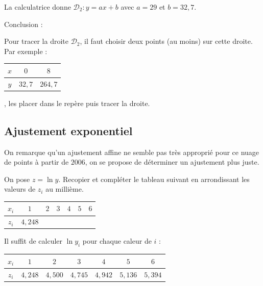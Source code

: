\documentclass[french]{book}
\begin{document}
La calculatrice donne $\mathcal{D}_2:y=ax+b$ avec $a=29$ et $b=32,7$.

Conclusion : 

Pour tracer la droite $\mathcal{D}_2$, il faut choisir deux points (au moins) sur cette droite.\\
Par exemple : \quad 
\begin{tabular}{C{1}|C{1}|C{1}}
   $x$ & $0$ & $8$ \\
   \hline
   $y$ & $32,7$ & $264,7$ \\
\end{tabular}
\quad , les placer dans le repère puis tracer la droite.

\subsection{Ajustement exponentiel}%

On remarque qu'un ajustement affine ne semble pas très approprié pour ce nuage de points à partir de $2006$, on se propose de déterminer un ajustement plus juste.



\begin{exemple}
   On pose $z=\ln y$. Recopier et compléter le tableau suivant en arrondissant les valeurs de $z_{i}$ au millième. 
   \begin{center}
      \begin{tabular}{|*{7}{C{1}|}}
         \hline
         $x_{i}$ & $1$ & $2$ & $3$ & $4$ & $5$ & $6$ \\
         \hline
         $z_{i}$ & $4,248$ & & & & & \\
         \hline
      \end{tabular}
   \end{center}
\end{exemple}

Il suffit de calculer $\ln y_i$ pour chaque caleur de $i$ :
\begin{center}
   \begin{tabular}{|*{7}{C{1}|}}
      \hline
      $x_{i}$ & $1$ & $2$ & $3$ & $4$ & $5$ & $6$ \\
      \hline
      $z_{i}$ & $4,248$ & $4,500$ & $4,745$ & $4,942$ & $5,136$ & $5,394$ \\
      \hline
   \end{tabular}
\end{center}
\end{document}
